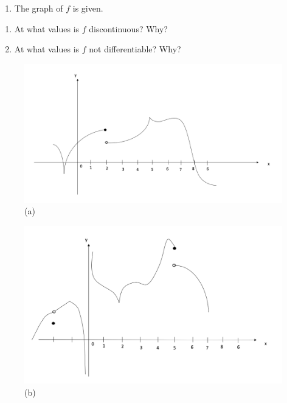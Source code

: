 \documentclass[]{book}
\providecommand{\tightlist}{%
  \setlength{\itemsep}{0pt}\setlength{\parskip}{0pt}}
\begin{document}
\begin{enumerate}
\def\labelenumi{\arabic{enumi}.}
\setcounter{enumi}{2}
\tightlist
\item
  The graph of \(f\) is given.
\end{enumerate}

\begin{enumerate}
\def\labelenumi{(\roman{enumi})}
\tightlist
\item
  At what values is \(f\) discontinuous? Why?
\item
  At what values is \(f\) not differentiable? Why?
\end{enumerate}

\begin{figure}

{\centering \includegraphics[width=0.7\linewidth]{figure/5Derivatives-9} 

}

\caption{(a)}\label{fig:p1}
\end{figure}

\begin{figure}

{\centering \includegraphics[width=0.7\linewidth]{figure/5Derivatives-10} 

}

\caption{(b)}\label{fig:p2}
\end{figure}
\end{document}
